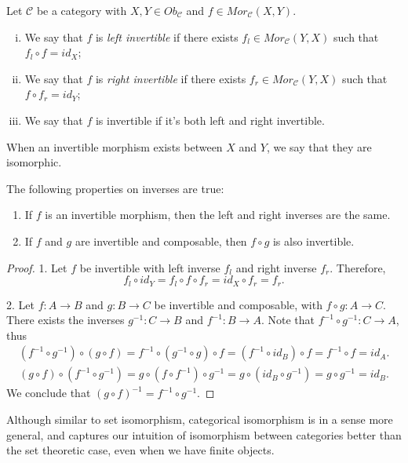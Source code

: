 \begin{definition}
  Let $\mathcal C$ be a category with $X,Y \in Ob_\mathcal C$ and $f \in Mor_\mathcal C (X,Y)$.
  \begin{enumerate}[(i)]
    \item We say that $f$ is \textit{left invertible} if there exists $f_l \in Mor_\mathcal C (Y,X)$ such
      that $f_l \circ f = id_X$;
    \item We say that $f$ is \textit{right invertible} if there exists $f_r \in Mor_\mathcal C (Y,X)$ such
      that $f \circ f_r = id_Y$;
    \item We say that $f$ is invertible if it's both left and right invertible.
  \end{enumerate}
  When an invertible morphism exists between $X$ and $Y$, we say that they are isomorphic.
  \label{def:CategoricalIsomorphism}
\end{definition}

\begin{proposition}
  The following properties on inverses are true:
  \begin{enumerate}[1.]
    \item If $f$ is an invertible morphism, then the left and right inverses are the same.
    \item If $f$ and $g$ are invertible and composable, then $f \circ g$ is also invertible.
  \end{enumerate}
\end{proposition}
\begin{proof}
1. Let $f$ be invertible with left inverse $f_l$ and right inverse $f_r$. Therefore,
\begin{displaymath}
  f_l \circ id_Y = f_l \circ f \circ f_r = id_X \circ f_r = f_r.
\end{displaymath}

2. Let $f:A\to B$ and $g: B \to C$ be invertible and composable, with $f\circ g: A \to C$.
There exists the inverses $g^{-1}: C \to B$ and $f^{-1}:B \to A$. Note that
$f^{-1}\circ g^{-1}:C \to A$, thus
\begin{align*}
  (f^{-1} \circ g^{-1}) \circ (g \circ f) =
  f^{-1} \circ (g^{-1} \circ g) \circ f =
  (f^{-1} \circ id_B) \circ f =
  f^{-1} \circ f =
  id_A.
\end{align*}
\begin{align*}
  (g \circ f) \circ (f^{-1} \circ g^{-1})  =
  g \circ (f \circ f^{-1}) \circ g^{-1} =
  g \circ (id_B \circ g^{-1}) =
  g \circ g^{-1} =
  id_B.
\end{align*}
We conclude that $(g\circ f)^{-1} = f^{-1} \circ g^{-1}$.
  
\end{proof}
Although similar to set isomorphism, categorical isomorphism is in a sense more general,
and captures our intuition of isomorphism between categories better than the set theoretic case,
even when we have finite objects.

